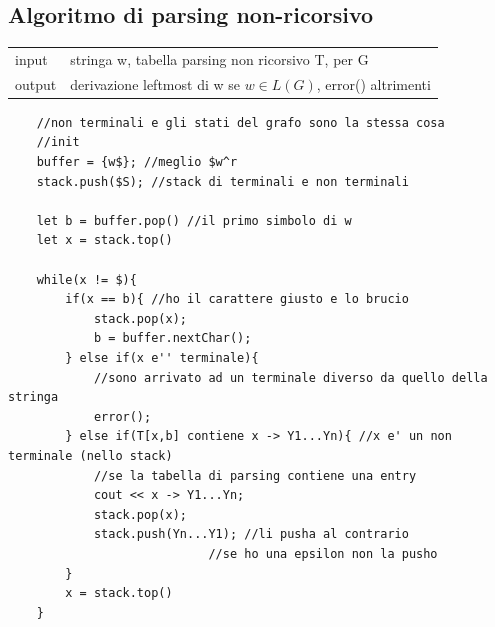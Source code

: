 \subsection{Algoritmo di parsing non-ricorsivo}
\begin{center}
    \begin{tabular}{ll}
        input   &   stringa w, tabella parsing non ricorsivo T, per G\\
        output  &   derivazione leftmost di w se $w \in L(G)$, error() altrimenti\\
    \end{tabular}
\end{center}

\begin{lstlisting}
    //non terminali e gli stati del grafo sono la stessa cosa
    //init
    buffer = {w$}; //meglio $w^r
    stack.push($S); //stack di terminali e non terminali

    let b = buffer.pop() //il primo simbolo di w 
    let x = stack.top()  

    while(x != $){
        if(x == b){ //ho il carattere giusto e lo brucio
            stack.pop(x);
            b = buffer.nextChar();
        } else if(x e'' terminale){ 
            //sono arrivato ad un terminale diverso da quello della stringa
            error();
        } else if(T[x,b] contiene x -> Y1...Yn){ //x e' un non terminale (nello stack)
            //se la tabella di parsing contiene una entry 
            cout << x -> Y1...Yn;
            stack.pop(x);
            stack.push(Yn...Y1); //li pusha al contrario
                            //se ho una epsilon non la pusho
        }
        x = stack.top()
    }
\end{lstlisting}

